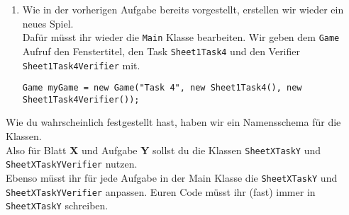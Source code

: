 
\newcommand{\javadocRoot}{https://fius.github.io/ICGE2/master/} 

\begin{enumerate}
    \item Wie in der vorherigen Aufgabe bereits vorgestellt, erstellen wir wieder ein neues Spiel.\\
        Dafür müsst ihr wieder die \lstinline{Main} Klasse bearbeiten.
        Wir geben dem \lstinline{Game} Aufruf den Fenstertitel, den Task \lstinline{Sheet1Task4} und den Verifier \lstinline{Sheet1Task4Verifier} mit.

    \begin{lstlisting}
Game myGame = new Game("Task 4", new Sheet1Task4(), new Sheet1Task4Verifier());
    \end{lstlisting}
\end{enumerate}


\begin{Infobox}
    Wie du wahrscheinlich festgestellt hast, haben wir ein Namensschema für die Klassen.\\
    Also für Blatt \textbf{X} und Aufgabe \textbf{Y} sollst du die Klassen \lstinline{SheetXTaskY} und \lstinline{SheetXTaskYVerifier} nutzen.\\
    Ebenso müsst ihr für jede Aufgabe in der Main Klasse die \lstinline{SheetXTaskY} und \lstinline{SheetXTaskYVerifier} anpassen.
    Euren Code müsst ihr (fast) immer in \lstinline{SheetXTaskY} schreiben.
\end{Infobox}


